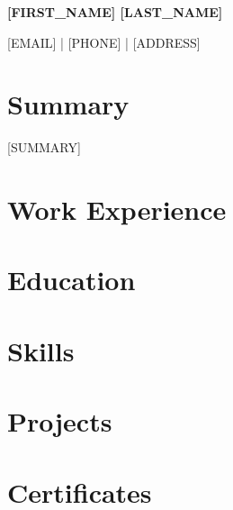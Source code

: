 \documentclass[11pt,a4paper]{article}
\newcommand{\name}[1]{\begin{center}\LARGE\bfseries #1\end{center}}
\newcommand{\contact}[1]{\begin{center} #1 \end{center}}
\begin{document}
\name{[FIRST_NAME] [LAST_NAME]}
\contact{[EMAIL] | [PHONE] | [ADDRESS]}

\vspace{10pt}

\section{Summary}
[SUMMARY]

\section{Work Experience}

\section{Education}

\section{Skills}

\section{Projects}

\section{Certificates}
\end{document}
